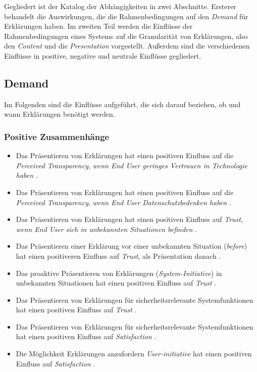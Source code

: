 Gegliedert ist der Katalog der Abhängigkeiten in zwei Abschnitte. Ersterer behandelt die Auswirkungen, die die Rahmenbedingungen auf den \textit{Demand} für Erklärungen haben. Im zweiten Teil werden die Einflüsse der Rahmenbedingungen eines Systems auf die Granularität von Erklärungen, also den \textit{Content} und die \textit{Presentation} vorgestellt. Außerdem sind die verschiedenen Einflüsse in positive, negative und neutrale Einflüsse gegliedert.

\subsection*{Demand}

Im Folgenden sind die Einflüsse aufgeführt, die sich darauf beziehen, ob und wann Erklärungen benötigt werden.

\subsubsection*{Positive Zusammenhänge}

\begin{itemize}
    \item Das Präsentieren von Erklärungen hat einen positiven Einfluss auf die \textit{Perceived Transparency}, \textit{wenn End User geringes Vertrauen in Technologie haben} \cite{tsai_effects_2020}. 
    \item Das Präsentieren von Erklärungen hat einen positiven Einfluss auf die \textit{Perceived Transparency}, \textit{wenn End User Datenschutzbedenken haben} \cite{tsai_effects_2020}.
    \item Das Präsentieren von Erklärungen hat einen positiven Einfluss auf \textit{Trust}, \textit{wenn End User sich in unbekannten Situationen befinden} \cite{haspiel_explanations_2018}.
    \item Das Präsentieren einer Erklärung vor einer unbekannten Situation (\textit{before}) hat einen positiveren Einfluss auf \textit{Trust}, als Präsentation danach \cite{haspiel_explanations_2018}.
    \item Das proaktive Präsentieren von Erklärungen (\textit{System-Initiative}) in unbekannten Situationen hat einen positiven Einfluss auf \textit{Trust} \cite{zhu_effects_2020}.
    \item Das Präsentieren von Erklärungen für sicherheitsrelevante Systemfunktionen hat einen positiven Einfluss auf \textit{Trust}  \cite{wiegand2019drive}.
    \item Das Präsentieren von Erklärungen für sicherheitsrelevante Systemfunktionen hat einen positiven Einfluss auf \textit{Satisfaction}  \cite{wiegand2019drive}.
    \item Die Möglichkeit Erklärungen anzufordern \textit{User-initiative} hat einen positiven Einfluss auf \textit{Satisfaction} \cite{chazette_end-users_nodate}.
\end{itemize}

